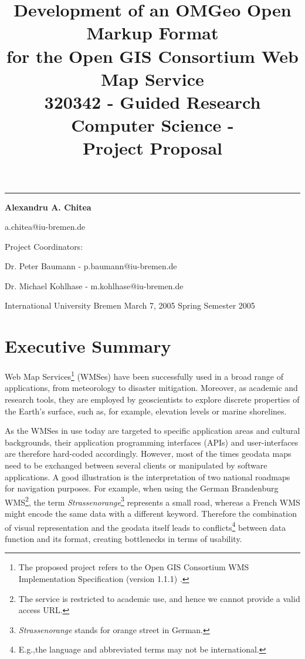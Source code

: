 \documentclass[a4paper,11pt,openany,notitlepage]{article}
\title{
\begin{flushright}
Development of an OMGeo Open Markup Format \\ {for the Open GIS Consortium Web Map Service}
\\ {\large{320342 - Guided Research Computer Science -}} \\ {\normalsize{Project Proposal}}
\end{flushright}}
\author{}
\date{}
\begin{document}
\maketitle \hrule
\begin{flushright}
\Large{\textbf{Alexandru A. Chitea}}
\end{flushright}

\begin{flushright}
\small{a.chitea@iu-bremen.de}
\end{flushright}
\vspace{1cm}
\begin{flushright}
\large{Project Coordinators:}
\end{flushright}

\begin{flushright}
\normalsize{Dr. Peter Baumann - p.baumann@iu-bremen.de}
\end{flushright}
\begin{flushright}
\normalsize{Dr. Michael Kohlhase - m.kohlhase@iu-bremen.de}
\end{flushright}
\vspace{11cm}
International University Bremen\hspace{1.25cm} March 7, 2005\hspace{1.25cm} Spring Semester 2005


\newpage
\tableofcontents
\listoffigures %
\listoftables  %
\newpage
\section{Executive Summary} \label{sec:execsummary}
\indent

Web Map Services\footnote{The proposed project refers to the Open GIS Consortium WMS Implementation Specification (version 1.1.1) \cite{ogc}.} (WMSes) have been successfully used in a broad range of applications, from meteorology to disaster mitigation. Moreover, as academic and research tools, they are employed by geoscientists to explore discrete properties of the Earth's surface, such as, for example, elevation levels or marine shorelines.

As the WMSes in use today are targeted to specific application areas and cultural backgrounds, their application programming interfaces (APIs) and user-interfaces are therefore hard-coded accordingly. However, most of the times geodata maps need to be exchanged between several clients or manipulated by software applications. A good illustration is the interpretation of two national roadmaps for navigation purposes. For example, when using the German Brandenburg WMS\footnote{The service is restricted to academic use, and hence we cannot provide a valid access URL.}, the term \textit{Strassenorange}\footnote{\textit{Strassenorange} stands for orange street in German.} represents a small road, whereas a French WMS might encode the same data with a different keyword. Therefore the combination of visual representation and the geodata itself leads to conflicts\footnote{E.g.,the language and abbreviated terms may not be international.} between data function and its format, creating bottlenecks in terms of usability.
\end{document}
